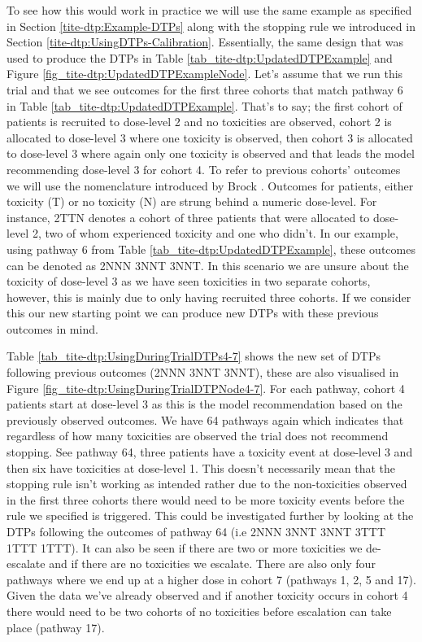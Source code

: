 To see how this would work in practice we will use the same example as specified in Section \ref{tite-dtp:Example-DTPs} along with the stopping rule we introduced in Section \ref{tite-dtp:UsingDTPs-Calibration}. Essentially, the same design that was used to produce the DTPs in Table \ref{tab_tite-dtp:UpdatedDTPExample} and Figure \ref{fig_tite-dtp:UpdatedDTPExampleNode}. Let's assume that we run this trial and that we see outcomes for the first three cohorts that match pathway 6 in Table \ref{tab_tite-dtp:UpdatedDTPExample}. That's to say; the first cohort of patients is recruited to dose-level 2 and no toxicities are observed, cohort 2 is allocated to dose-level 3 where one toxicity is observed, then cohort 3 is allocated to dose-level 3 where again only one toxicity is observed and that leads the model recommending dose-level 3 for cohort 4. To refer to previous cohorts' outcomes we will use the nomenclature introduced by Brock \cite{brockImplementingEffToxDosefinding2017}. Outcomes for patients, either toxicity (T) or no toxicity (N) are strung behind a numeric dose-level. For instance, 2TTN denotes a cohort of three patients that were allocated to dose-level 2, two of whom experienced toxicity and one who didn't. In our example, using pathway 6 from Table \ref{tab_tite-dtp:UpdatedDTPExample}, these outcomes can be denoted as 2NNN 3NNT 3NNT. In this scenario we are unsure about the toxicity of dose-level 3 as we have seen toxicities in two separate cohorts, however, this is mainly due to only having recruited three cohorts. If we consider this our new starting point we can produce new DTPs with these previous outcomes in mind. 

Table \ref{tab_tite-dtp:UsingDuringTrialDTPs4-7} shows the new set of DTPs following previous outcomes (2NNN 3NNT 3NNT), these are also visualised in Figure \ref{fig_tite-dtp:UsingDuringTrialDTPNode4-7}. For each pathway, cohort 4 patients start at dose-level 3 as this is the model recommendation based on the previously observed outcomes. We have 64 pathways again which indicates that regardless of how many toxicities are observed the trial does not recommend stopping. See pathway 64, three patients have a toxicity event at dose-level 3 and then six have toxicities at dose-level 1. This doesn't necessarily mean that the stopping rule isn't working as intended rather due to the non-toxicities observed in the first three cohorts there would need to be more toxicity events before the rule we specified is triggered. This could be investigated further by looking at the DTPs following the outcomes of pathway 64 (i.e 2NNN 3NNT 3NNT 3TTT 1TTT 1TTT). It can also be seen if there are two or more toxicities we de-escalate and if there are no toxicities we escalate. There are also only four pathways where we end up at a higher dose in cohort 7 (pathways 1, 2, 5 and 17). Given the data we've already observed and if another toxicity occurs in cohort 4 there would need to be two cohorts of no toxicities before escalation can take place (pathway 17). 


